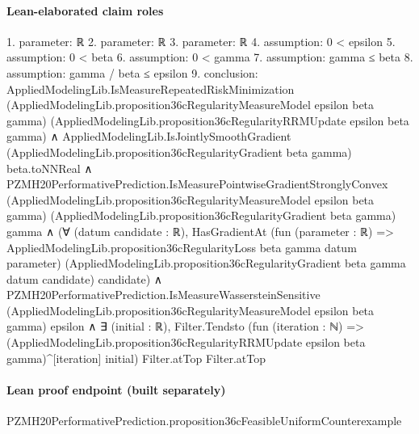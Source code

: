 \documentclass[10pt]{article}
\begin{document}
\paragraph{Lean-elaborated claim roles}\begin{ReviewVerbatim}
1. parameter: ℝ
2. parameter: ℝ
3. parameter: ℝ
4. assumption: 0 < epsilon
5. assumption: 0 < beta
6. assumption: 0 < gamma
7. assumption: gamma ≤ beta
8. assumption: gamma / beta ≤ epsilon
9. conclusion: AppliedModelingLib.IsMeasureRepeatedRiskMinimization
    (AppliedModelingLib.proposition36cRegularityMeasureModel epsilon beta gamma)
    (AppliedModelingLib.proposition36cRegularityRRMUpdate epsilon beta gamma) ∧
  AppliedModelingLib.IsJointlySmoothGradient (AppliedModelingLib.proposition36cRegularityGradient beta gamma)
      beta.toNNReal ∧
    PZMH20PerformativePrediction.IsMeasurePointwiseGradientStronglyConvex
        (AppliedModelingLib.proposition36cRegularityMeasureModel epsilon beta gamma)
        (AppliedModelingLib.proposition36cRegularityGradient beta gamma) gamma ∧
      (∀ (datum candidate : ℝ),
          HasGradientAt
            (fun (parameter : ℝ) => AppliedModelingLib.proposition36cRegularityLoss beta gamma datum parameter)
            (AppliedModelingLib.proposition36cRegularityGradient beta gamma datum candidate) candidate) ∧
        PZMH20PerformativePrediction.IsMeasureWassersteinSensitive
            (AppliedModelingLib.proposition36cRegularityMeasureModel epsilon beta gamma) epsilon ∧
          ∃ (initial : ℝ),
            Filter.Tendsto
              (fun (iteration : ℕ) =>
                (AppliedModelingLib.proposition36cRegularityRRMUpdate epsilon beta gamma)^[iteration] initial)
              Filter.atTop Filter.atTop
\end{ReviewVerbatim}

\paragraph{Lean proof endpoint (built separately)}\begin{ReviewVerbatim}
PZMH20PerformativePrediction.proposition36cFeasibleUniformCounterexample
\end{ReviewVerbatim}
\end{document}
